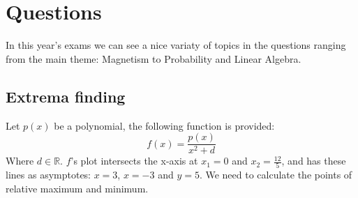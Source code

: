 
\chapter[Questions]{Questions}
\label{ch:qs}

In this year's exams we can see a nice variaty of topics in the questions
ranging from the main theme: Magnetism to Probability and Linear Algebra.

\section{Extrema finding}
\label{sec:extremafind}
Let $p(x)$ be a polynomial, the following function is provided:
\begin{equation*}
    f(x) = \frac{p(x)}{x^2 + d}
\end{equation*}
Where $d \in \mathbb{R}$. $f$'s plot intersects the x-axis at $x_1 = 0$ and
$x_2 = \frac{12}{5}$, and has these lines as asymptotes: $x=3$, $x=-3$ and
$y=5$. We need to calculate the points of relative maximum and minimum.

